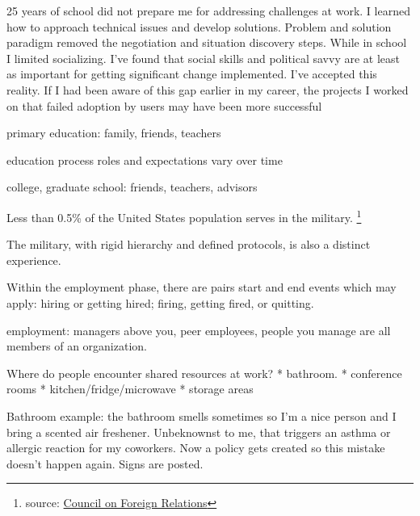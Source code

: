 
25 years of school did not prepare me for addressing challenges at work. I learned how to approach technical issues and develop solutions. Problem and solution paradigm removed the negotiation and situation discovery steps. While in school I limited socializing. I've found that social skills and political savvy are at least as important for getting significant change implemented.  I've accepted this reality. If I had been aware of this gap earlier in my career, the projects I worked on that failed adoption by users may have been more successful



primary education: family, friends, teachers


 education process roles and expectations vary over time

college, graduate school: friends, teachers, advisors



Less than 0.5\% of the United States population serves in the military. \footnote{source: \href{https://www.cfr.org/backgrounder/demographics-us-military}{Council on Foreign Relations}}

The military, with rigid hierarchy and defined protocols, is also a distinct experience. 



Within the employment phase, there are pairs start and end events which may apply: hiring or getting hired; firing, getting fired, or quitting. 

employment: managers above you, peer employees, people you manage are all members of an organization. 


Where do people encounter shared resources at work?
* bathroom. 
* conference rooms
* kitchen/fridge/microwave
* storage areas

Bathroom example: the bathroom smells sometimes so I'm a nice person and I bring a scented air freshener. Unbeknownst to me, that triggers an asthma or allergic reaction for my coworkers. Now a policy gets created so this mistake doesn't happen again. Signs are posted. 



